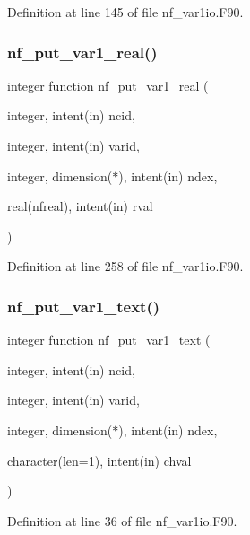 Definition at line 145 of file nf\+\_\+var1io.\+F90.

\mbox{\label{nf__var1io_8F90_a93ed859f7cafc1f17e0c3d02aeb25ccf}} 
\subsubsection{\texorpdfstring{nf\+\_\+put\+\_\+var1\+\_\+real()}{nf\_put\_var1\_real()}}
{\footnotesize\ttfamily integer function nf\+\_\+put\+\_\+var1\+\_\+real (\begin{DoxyParamCaption}\item[{integer, intent(in)}]{ncid,  }\item[{integer, intent(in)}]{varid,  }\item[{integer, dimension($\ast$), intent(in)}]{ndex,  }\item[{real(nfreal), intent(in)}]{rval }\end{DoxyParamCaption})}



Definition at line 258 of file nf\+\_\+var1io.\+F90.

\mbox{\label{nf__var1io_8F90_ab62d8766bbb405b35c7a6bb2fc3aaf35}} 
\subsubsection{\texorpdfstring{nf\+\_\+put\+\_\+var1\+\_\+text()}{nf\_put\_var1\_text()}}
{\footnotesize\ttfamily integer function nf\+\_\+put\+\_\+var1\+\_\+text (\begin{DoxyParamCaption}\item[{integer, intent(in)}]{ncid,  }\item[{integer, intent(in)}]{varid,  }\item[{integer, dimension($\ast$), intent(in)}]{ndex,  }\item[{character(len=1), intent(in)}]{chval }\end{DoxyParamCaption})}



Definition at line 36 of file nf\+\_\+var1io.\+F90.

